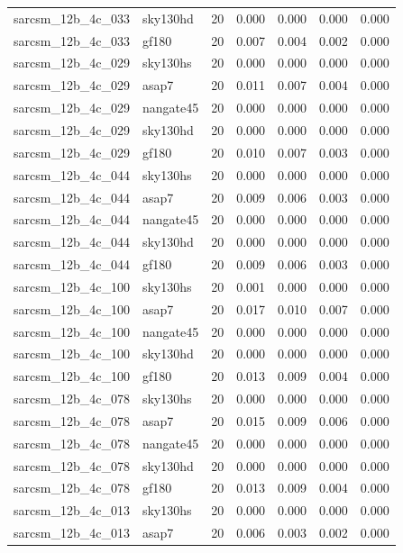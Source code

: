 \begin{tabular}{llrrrrr}
sarcsm\_12b\_4c\_033 & sky130hd & 20 & 0.000 & 0.000 & 0.000 & 0.000 \\
sarcsm\_12b\_4c\_033 & gf180 & 20 & 0.007 & 0.004 & 0.002 & 0.000 \\
sarcsm\_12b\_4c\_029 & sky130hs & 20 & 0.000 & 0.000 & 0.000 & 0.000 \\
sarcsm\_12b\_4c\_029 & asap7 & 20 & 0.011 & 0.007 & 0.004 & 0.000 \\
sarcsm\_12b\_4c\_029 & nangate45 & 20 & 0.000 & 0.000 & 0.000 & 0.000 \\
sarcsm\_12b\_4c\_029 & sky130hd & 20 & 0.000 & 0.000 & 0.000 & 0.000 \\
sarcsm\_12b\_4c\_029 & gf180 & 20 & 0.010 & 0.007 & 0.003 & 0.000 \\
sarcsm\_12b\_4c\_044 & sky130hs & 20 & 0.000 & 0.000 & 0.000 & 0.000 \\
sarcsm\_12b\_4c\_044 & asap7 & 20 & 0.009 & 0.006 & 0.003 & 0.000 \\
sarcsm\_12b\_4c\_044 & nangate45 & 20 & 0.000 & 0.000 & 0.000 & 0.000 \\
sarcsm\_12b\_4c\_044 & sky130hd & 20 & 0.000 & 0.000 & 0.000 & 0.000 \\
sarcsm\_12b\_4c\_044 & gf180 & 20 & 0.009 & 0.006 & 0.003 & 0.000 \\
sarcsm\_12b\_4c\_100 & sky130hs & 20 & 0.001 & 0.000 & 0.000 & 0.000 \\
sarcsm\_12b\_4c\_100 & asap7 & 20 & 0.017 & 0.010 & 0.007 & 0.000 \\
sarcsm\_12b\_4c\_100 & nangate45 & 20 & 0.000 & 0.000 & 0.000 & 0.000 \\
sarcsm\_12b\_4c\_100 & sky130hd & 20 & 0.000 & 0.000 & 0.000 & 0.000 \\
sarcsm\_12b\_4c\_100 & gf180 & 20 & 0.013 & 0.009 & 0.004 & 0.000 \\
sarcsm\_12b\_4c\_078 & sky130hs & 20 & 0.000 & 0.000 & 0.000 & 0.000 \\
sarcsm\_12b\_4c\_078 & asap7 & 20 & 0.015 & 0.009 & 0.006 & 0.000 \\
sarcsm\_12b\_4c\_078 & nangate45 & 20 & 0.000 & 0.000 & 0.000 & 0.000 \\
sarcsm\_12b\_4c\_078 & sky130hd & 20 & 0.000 & 0.000 & 0.000 & 0.000 \\
sarcsm\_12b\_4c\_078 & gf180 & 20 & 0.013 & 0.009 & 0.004 & 0.000 \\
sarcsm\_12b\_4c\_013 & sky130hs & 20 & 0.000 & 0.000 & 0.000 & 0.000 \\
sarcsm\_12b\_4c\_013 & asap7 & 20 & 0.006 & 0.003 & 0.002 & 0.000 \\

\end{tabular}
